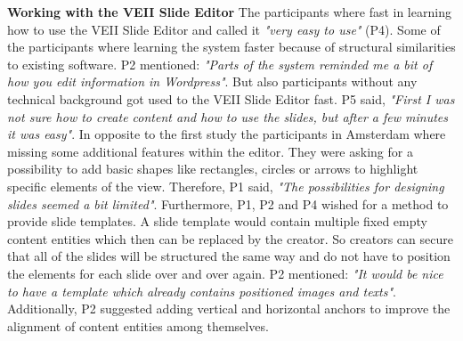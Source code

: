 \textbf{Working with the VEII Slide Editor}
\newline
The participants where fast in learning how to use the VEII Slide Editor and called it \textit{"very easy to use"} (P4). Some of the participants where learning the system faster because of structural similarities to existing software. P2 mentioned: \textit{"Parts of the system reminded me a bit of how you edit information in Wordpress"}. But also participants without any technical background got used to the VEII Slide Editor fast. P5 said, \textit{"First I was not sure how to create content and how to use the slides, but after a few minutes it was easy"}. In opposite to the first study the participants in Amsterdam where missing some additional features within the editor. They were asking for a possibility to add basic shapes like rectangles, circles or arrows to highlight specific elements of the view. Therefore, P1 said, \textit{"The possibilities for designing slides seemed a bit limited"}. Furthermore, P1, P2 and P4 wished for a method to provide slide templates. A slide template would contain multiple fixed empty content entities which then can be replaced by the creator. So creators can secure that all of the slides will be structured the same way and do not have to position the elements for each slide over and over again. P2 mentioned: \textit{"It would be nice to have a template which already contains positioned images and texts"}. Additionally, P2 suggested adding vertical and horizontal anchors to improve the alignment of content entities among themselves.
\newline


